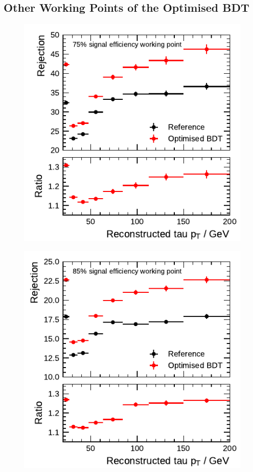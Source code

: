 \clearpage
\subsection{Other Working Points of the Optimised BDT}
\label{app:bdt_working_point_rejection}
\noindent
\begin{minipage}{\textwidth}
  \captionsetup{type=figure}
  \begin{subfigure}{0.48\textwidth}
    \centering
    \includegraphics{./figures/bdt_perf/post_optimisation/rejection_medium_1p.pdf}
  \end{subfigure}\hfill
  \begin{subfigure}{0.48\textwidth}
    \centering
    \includegraphics{./figures/bdt_perf/post_optimisation/rejection_loose_1p.pdf}

\end{subfigure}
\end{minipage}
